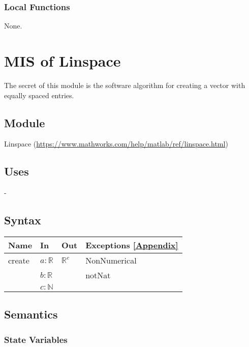 \documentclass[12pt, titlepage]{article}
\begin{document}
\subsubsection{Local Functions} 

None. 

\newpage 

\section{MIS of Linspace} \label{MLIN}

The secret of this module is the software algorithm for creating a vector with 
equally spaced entries. 

\subsection{Module}

Linspace (\url{https://www.mathworks.com/help/matlab/ref/linspace.html})

\subsection{Uses}

-

\subsection{Syntax}

\begin{center}
	\begin{tabular}{p{2cm} p{6cm} p{6cm} p{3cm}}
		\hline
		\textbf{Name} & \textbf{In} & \textbf{Out} & \textbf{Exceptions} 
		\ref{Appendix}\\
		\hline
		create & $a : \mathbb{R}$ & $\mathbb{R}^{c}$ & 
		NonNumerical \\
		& $b : \mathbb{R}$ &  & notNat \\  
		& $c : \mathbb{N}$ &  &  \\ 
		\hline
	\end{tabular}
\end{center}

\subsection{Semantics}

\subsubsection{State Variables}
\end{document}
